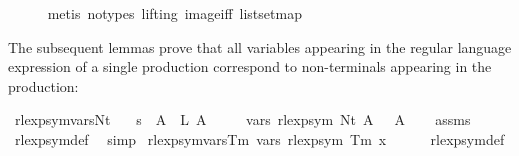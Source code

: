 \begin{isabellebody}
\ \ \ \ \isamarkupfalse%
\ {\isacharparenleft}{\kern0pt}metis\ {\isacharparenleft}{\kern0pt}no{\isacharunderscore}{\kern0pt}types{\isacharcomma}{\kern0pt}\ lifting{\isacharparenright}{\kern0pt}\ image{\isacharunderscore}{\kern0pt}iff\ list{\isachardot}{\kern0pt}set{\isacharunderscore}{\kern0pt}map{\isacharparenright}{\kern0pt}\isanewline
{}\isamarkupfalse%
%
\endisatagproof
{\isafoldproof}%
%
\isadelimproof
%
\endisadelimproof
%
\begin{isamarkuptext}%
The subsequent lemmas prove that all variables appearing in the regular language
expression of a single production correspond to non-terminals appearing in the production:%
\end{isamarkuptext}\isamarkuptrue%
\isamarkupfalse%
\ rlexp{\isacharunderscore}{\kern0pt}sym{\isacharunderscore}{\kern0pt}vars{\isacharunderscore}{\kern0pt}Nt{\isacharcolon}{\kern0pt}\isanewline
\ \ \ {\isachardoublequoteopen}s\ {\isacharparenleft}{\kern0pt}{\isasymgamma}{\isacharprime}{\kern0pt}\ A{\isacharparenright}{\kern0pt}\ {\isacharequal}{\kern0pt}\ L\ A{\isachardoublequoteclose}\isanewline
\ \ \ \ \ {\isachardoublequoteopen}vars\ {\isacharparenleft}{\kern0pt}rlexp{\isacharunderscore}{\kern0pt}sym\ {\isacharparenleft}{\kern0pt}Nt\ A{\isacharparenright}{\kern0pt}{\isacharparenright}{\kern0pt}\ {\isacharequal}{\kern0pt}\ {\isacharbraceleft}{\kern0pt}{\isasymgamma}{\isacharprime}{\kern0pt}\ A{\isacharbraceright}{\kern0pt}{\isachardoublequoteclose}\isanewline
%
\isadelimproof
\ \ %
\endisadelimproof
%
\isatagproof
{}\isamarkupfalse%
\ assms\ \isamarkupfalse%
\ rlexp{\isacharunderscore}{\kern0pt}sym{\isacharunderscore}{\kern0pt}def\ \isamarkupfalse%
\ simp%
\endisatagproof
{\isafoldproof}%
%
\isadelimproof
\isanewline
%
\endisadelimproof
\isanewline
{}\isamarkupfalse%
\ rlexp{\isacharunderscore}{\kern0pt}sym{\isacharunderscore}{\kern0pt}vars{\isacharunderscore}{\kern0pt}Tm{\isacharcolon}{\kern0pt}\ {\isachardoublequoteopen}vars\ {\isacharparenleft}{\kern0pt}rlexp{\isacharunderscore}{\kern0pt}sym\ {\isacharparenleft}{\kern0pt}Tm\ x{\isacharparenright}{\kern0pt}{\isacharparenright}{\kern0pt}\ {\isacharequal}{\kern0pt}\ {\isacharbraceleft}{\kern0pt}{\isacharbraceright}{\kern0pt}{\isachardoublequoteclose}\isanewline
%
\isadelimproof
\ \ %
\endisadelimproof
%
\isatagproof
{}\isamarkupfalse%
\ rlexp{\isacharunderscore}{\kern0pt}sym{\isacharunderscore}{\kern0pt}def\ \isamarkupfalse%

\end{isabellebody}
